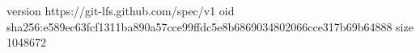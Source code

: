 version https://git-lfs.github.com/spec/v1
oid sha256:e589ec63fcf1311ba890a57cce99ffdc5e8b6869034802066cce317b69b64888
size 1048672
